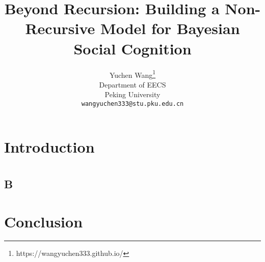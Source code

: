 \documentclass{article}
\title{Beyond Recursion: Building a Non-Recursive Model for Bayesian Social Cognition}
\author{%
  Yuchen Wang\thanks{https://wangyuchen333.github.io/} \\
  Department of EECS\\
  Peking University\\
  \texttt{wangyuchen333@stu.pku.edu.cn} \\
}
\begin{document}
\maketitle

\begin{abstract}

\end{abstract}


\section{Introduction}


\section{}


\section{}

\subsection{}


\subsection{B}



\section{Conclusion}




\end{document}
